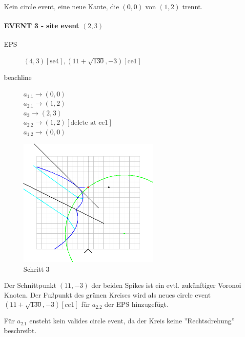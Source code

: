 Kein circle event, eine neue Kante, die $(0,0)$ von $(1,2)$ trennt.

\newpage

\paragraph*{EVENT 3 - site event $(2,3)$}
\begin{description}
\item[EPS] $(4,3)[\text{se4}], (11 + \sqrt{130}, -3)[\text{ce1}]$
\item[beachline]
$a_{1.1} \rightarrow (0,0)$\\
$a_{2.1} \rightarrow (1,2)$\\
$a_3 \rightarrow (2,3)$\\
$a_{2.2} \rightarrow (1,2)[\text{delete at ce1}]$\\
$a_{1.2} \rightarrow (0,0)$
\end{description}

\begin{figure}[h]
\begin{center}
\includegraphics[width=7cm]{capture3}
\end{center}
\caption{Schritt 3}
\label{fig:c3}
\end{figure}

Der Schnittpunkt $(11, -3)$ der beiden Spikes ist ein evtl. zukünftiger Voronoi Knoten. Der Fußpunkt des grünen Kreises wird als neues circle event $(11 + \sqrt{130}, -3)[ce1]$ für $a_{2.2}$ der EPS hinzugefügt.

Für $a_{2.1}$ ensteht kein valides circle event, da der Kreis keine ''Rechtsdrehung'' beschreibt.

\newpage

